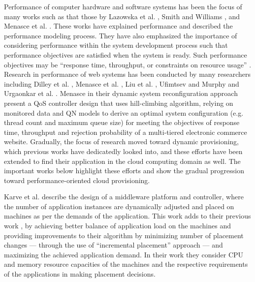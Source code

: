 \documentclass[10pt,journal,cspaper,compsoc]{IEEEtran}
\begin{document}
Performance of computer hardware and software systems has been the focus of many works such as that those by Lazowska et al. \cite{1984_LazowskaQSP_ref29}, Smith and Williams \cite{2002_PerfSolutions_ref23}, and Menasce et al. \cite{2001_Menasce_CapacityPlanning, 2004_Menasce_PerformanceByDesign}. These works have explained performance and described the performance modeling process. They have also emphasized the importance of considering performance within the system development process such that performance objectives are satisfied when the system is ready. Such performance objectives may be ``response time, throughput, or constraints on resource usage'' \cite[p.~29]{2002_PerfSolutions_ref23}. Research in performance of web systems has been conducted by many researchers including Dilley et al. \cite{1998_Dilley_Ref22}, Menasce et al. \cite{2001_Menasce_CapacityPlanning}, Liu et al. \cite{2004_LiuPerfEngineeringJava_ref4}, Ufimtsev and Murphy \cite{2006_Ufimtsev_ref6} and Urgaonkar et al. \cite{2007_UrgaonkarAnalyticModeling_ref8}. Menasce \cite{menasce2003automatic8} in their dynamic system reconfiguration approach present a QoS controller design that uses hill-climbing algorithm, relying on monitored data and QN models to derive an optimal system configuration (e.g. thread count and maximum queue size) for meeting the objectives of response time, throughput and rejection probability of a multi-tiered electronic commerce website. Gradually, the focus of research moved toward dynamic provisioning, which previous works have dedicatedly looked into, and these efforts have been extended to find their application in the cloud computing domain as well. The important works below highlight these efforts and show the gradual progression toward performance-oriented cloud provisioning.

Karve et al. \cite{2006_KarveTantawi_DynamicPlacementClusteredWebApps} describe the design of a middleware platform and controller, where the number of application instances are dynamically adjusted and placed on machines as per the demands of the application. This work adds to their previous work \cite{2005_KimbrelTantawi_DynamicPlacementService}, by achieving better balance of application load on the machines and providing improvements to their algorithm by minimizing number of placement changes --- through the use of ``incremental placement''\cite{2006_KarveTantawi_DynamicPlacementClusteredWebApps} approach ---  and maximizing the achieved application demand. In their work they consider CPU and memory resource capacities of the machines and the respective requirements of the applications in making placement decisions.
\end{document}
